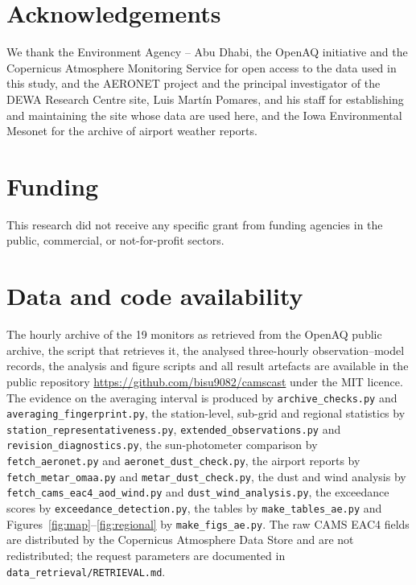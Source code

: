 \documentclass[preprint,review,12pt,number,sort&compress]{elsarticle}
\begin{document}
\section*{Acknowledgements}
We thank the Environment Agency -- Abu Dhabi, the OpenAQ initiative and the Copernicus Atmosphere
Monitoring Service for open access to the data used in this study, and the AERONET project and
the principal investigator of the DEWA Research Centre site, Luis Mart\'in Pomares, and his staff
for establishing and maintaining the site whose data are used here, and the Iowa Environmental
Mesonet for the archive of airport weather reports.

\section*{Funding}
This research did not receive any specific grant from funding agencies in the public, commercial,
or not-for-profit sectors.

\section*{Data and code availability}
\sloppy
The hourly archive of the 19 monitors as retrieved from the OpenAQ public archive, the script
that retrieves it, the analysed three-hourly observation--model records, the analysis and figure
scripts and all result artefacts are available in the public repository
\url{https://github.com/bisu9082/camscast} under the MIT licence. The evidence on the
averaging interval is produced by \texttt{archive\_checks.py} and
\texttt{averaging\_fingerprint.py}, the station-level, sub-grid and regional statistics by
\texttt{station\_representativeness.py}, \texttt{extended\_observations.py} and
\texttt{revision\_diagnostics.py}, the sun-photometer comparison by
\texttt{fetch\_aeronet.py} and \texttt{aeronet\_dust\_check.py}, the airport reports by
\texttt{fetch\_metar\_omaa.py} and \texttt{metar\_dust\_check.py}, the dust and wind analysis by
\texttt{fetch\_cams\_eac4\_aod\_wind.py} and \texttt{dust\_wind\_analysis.py}, the exceedance
scores by \texttt{exceedance\_detection.py}, the tables by \texttt{make\_tables\_ae.py} and
Figures~\ref{fig:map}--\ref{fig:regional} by \texttt{make\_figs\_ae.py}. The raw CAMS EAC4 fields
are distributed by the Copernicus Atmosphere Data Store and are not redistributed; the request
parameters are documented in \texttt{data\_retrieval/RETRIEVAL.md}.



\end{document}
